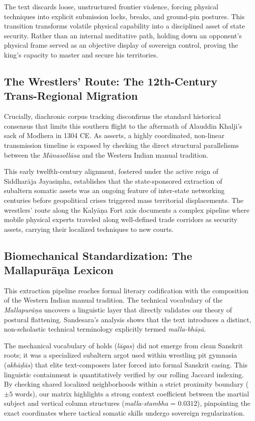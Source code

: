 \documentclass[11pt,twoside,letterpaper]{article}
\begin{document}
The text discards loose, unstructured frontier violence, forcing physical techniques into explicit submission locks, breaks, and ground-pin postures. This transition transforms volatile physical capability into a disciplined asset of state security. Rather than an internal meditative path, holding down an opponent’s physical frame served as an objective display of sovereign control, proving the king's capacity to master and secure his territories.

\subsection{The Wrestlers' Route: The 12th-Century Trans-Regional Migration}
Crucially, diachronic corpus tracking disconfirms the standard historical consensus that limits this southern flight to the aftermath of Alauddin Khalji's sack of Modhera in 1304 CE. As \citet{Sandesara1948} asserts, a highly coordinated, non-linear transmission timeline is exposed by checking the direct structural parallelisms between the \textit{Mānasollāsa} and the Western Indian manual tradition. 

This early twelfth-century alignment, fostered under the active reign of Siddharāja Jayasiṃha, establishes that the state-sponsored extraction of subaltern somatic assets was an ongoing feature of inter-state networking centuries before geopolitical crises triggered mass territorial displacements. The wrestlers' route along the Kalyāṇa Fort axis documents a complex pipeline where mobile physical experts traveled along well-defined trade corridors as security assets, carrying their localized techniques to new courts.

\subsection{Biomechanical Standardization: The Mallapurāṇa Lexicon}
This extraction pipeline reaches formal literary codification with the composition of the Western Indian manual tradition. The technical vocabulary of the \textit{Mallapurāṇa} uncovers a linguistic layer that directly validates our theory of postural flattening. Sandesara’s analysis shows that the text introduces a distinct, non-scholastic technical terminology explicitly termed \textit{malla-bhāṣā}. 

The mechanical vocabulary of holds (\textit{lāgas}) did not emerge from clean Sanskrit roots; it was a specialized subaltern argot used within wrestling pit gymnasia (\textit{akhāḍās}) that elite text-composers later forced into formal Sanskrit casing. This linguistic containment is quantitatively verified by our rolling Jaccard indexing. By checking shared localized neighborhoods within a strict proximity boundary ($\pm 5$ words), our matrix highlights a strong context coefficient between the martial subject and vertical column structures (\textit{malla-stambha} = $0.0312$), pinpointing the exact coordinates where tactical somatic skills undergo sovereign regularization.
\end{document}
